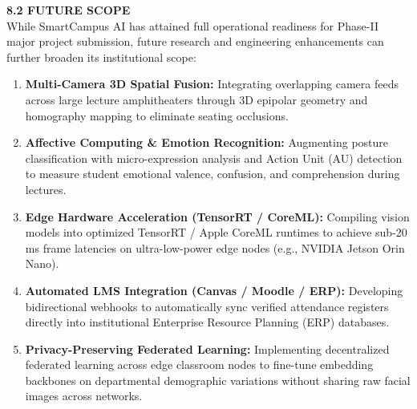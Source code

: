 \vspace{0.2in}
\noindent \textbf{8.2 FUTURE SCOPE} \\[2mm]
While SmartCampus AI has attained full operational readiness for Phase-II major project submission, future research and engineering enhancements can further broaden its institutional scope:
\begin{enumerate}
    \item \textbf{Multi-Camera 3D Spatial Fusion:} Integrating overlapping camera feeds across large lecture amphitheaters through 3D epipolar geometry and homography mapping to eliminate seating occlusions.
    \item \textbf{Affective Computing \& Emotion Recognition:} Augmenting posture classification with micro-expression analysis and Action Unit (AU) detection to measure student emotional valence, confusion, and comprehension during lectures.
    \item \textbf{Edge Hardware Acceleration (TensorRT / CoreML):} Compiling vision models into optimized TensorRT / Apple CoreML runtimes to achieve sub-20 ms frame latencies on ultra-low-power edge nodes (e.g., NVIDIA Jetson Orin Nano).
    \item \textbf{Automated LMS Integration (Canvas / Moodle / ERP):} Developing bidirectional webhooks to automatically sync verified attendance registers directly into institutional Enterprise Resource Planning (ERP) databases.
    \item \textbf{Privacy-Preserving Federated Learning:} Implementing decentralized federated learning across edge classroom nodes to fine-tune embedding backbones on departmental demographic variations without sharing raw facial images across networks.
\end{enumerate}
\newpage
